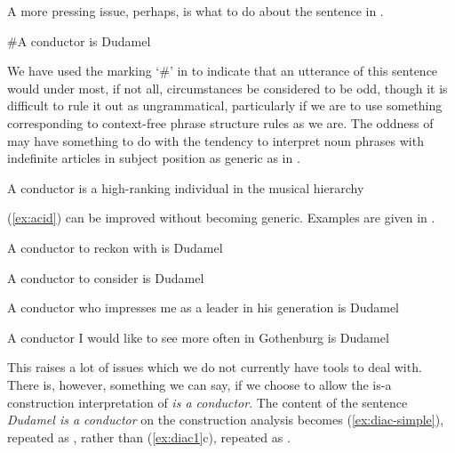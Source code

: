 A more pressing issue, perhaps, is what to do about the sentence in
\nexteg{}.
\begin{ex} 
\#A conductor is Dudamel
\label{ex:acid} 
\end{ex} 
We have used the marking `\#' in \preveg{} to indicate that an
utterance of this sentence would under most, if not all, circumstances
be considered to be odd, though it is difficult to rule it out as
ungrammatical, particularly if we are to use something corresponding
to context-free phrase structure rules as we are.  The oddness of
\preveg{} may have something to do with the tendency to interpret noun
phrases with indefinite articles in subject position as generic as in
\nexteg{}.
\begin{ex} 
A conductor is a high-ranking individual in the musical hierarchy 
\end{ex} 
(\ref{ex:acid}) can be improved without becoming generic.  Examples
are given in \nexteg{}.
\begin{ex} 
\begin{subex} 
 
\item A conductor to reckon with is Dudamel 
 
\item A conductor to consider is Dudamel

\item A conductor who impresses me as a leader in his generation is
  Dudamel

\item A conductor I would like to see more often in Gothenburg is Dudamel 
 
\end{subex} 
   
\end{ex} 
This raises a lot of issues which we do not currently have tools to
deal with.  There is, however, something we can say, if we choose to
allow the is-a construction interpretation of \textit{is a conductor}.
The content of the sentence \textit{Dudamel is a conductor} on the
construction analysis becomes (\ref{ex:diac-simple}), repeated as
, rather than (\ref{ex:diac1}c), repeated as .
\begin{ex} 
\begin{subex} 
 
\item {} 
 
\item {} 

\end{subex} 
\label{ex:diacTwice}    
\end{ex} 
